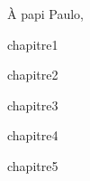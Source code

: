 \documentclass{these-ISSS} %
\begin{document}

  

  \maketitle

  \begin{dedicace}
    À papi Paulo,
  \end{dedicace}

  \cleardoublepage

  

  

  \tableofcontents

  \mainmatter

  {chapitre1}
  
  {chapitre2}
  
  {chapitre3}
  
  {chapitre4}
  
  {chapitre5}
  
  
  
  

  \backmatter

  \renewcommand{\bibtitle}{\bibchapter}
  
  







\end{document}
